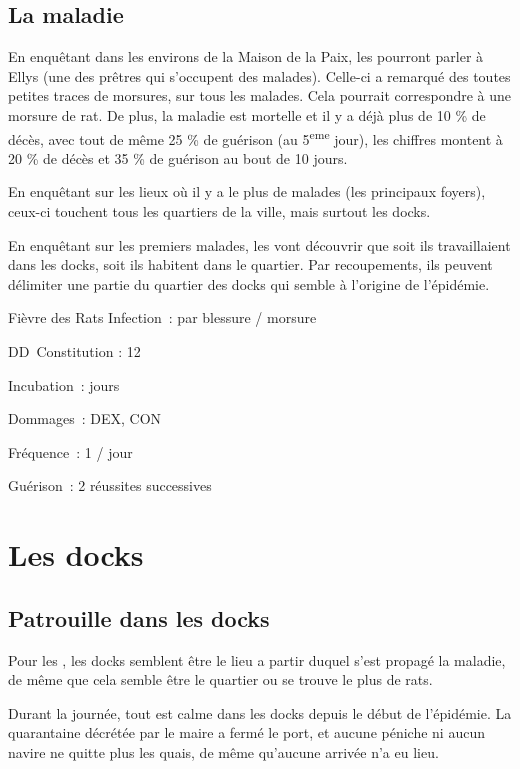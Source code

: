 \documentclass[a4paper,10pt,openany]{book}
\begin{document}
\begin{multicols}{2}
\subsection{La maladie}
En enquêtant dans les environs de la Maison de la Paix, les \PJs pourront parler à Ellys (une des prêtres qui s’occupent des malades). Celle-ci a
remarqué des toutes petites traces de morsures, sur tous les malades. Cela pourrait correspondre à une morsure de rat. De plus, la maladie est
mortelle et il y a déjà plus de 10 \% de décès, avec tout de même 25 \% de guérison (au 5\textsuperscript{eme} jour), les chiffres montent à 20 \% de
décès et 35 \% de guérison au bout de 10 jours.\par En enquêtant sur les lieux où il y a le plus de malades (les principaux foyers), ceux-ci touchent
tous les quartiers de la ville, mais surtout les  docks.\par En enquêtant sur les premiers malades, les \PJs vont découvrir que soit ils travaillaient
dans les docks, soit ils habitent dans le quartier. Par recoupements, ils peuvent délimiter une partie du quartier des docks qui semble à l’origine de
l’épidémie.

\begin{paperbox}{Fièvre des Rats}
	Infection : par blessure / morsure\par\noindent
	DD Constitution : 12\par\noindent
	Incubation :  jours\par\noindent
	Dommages :  DEX,  CON\par\noindent
	Fréquence : 1 / jour\par\noindent
	Guérison : 2 réussites successives
\end{paperbox}

\section{Les docks}
\subsection{Patrouille dans les docks}
Pour les \PJs, les docks semblent être le lieu a partir duquel s’est propagé la maladie, de même que cela semble être le quartier ou se trouve le plus
de rats. \par Durant la journée, tout est calme dans les docks depuis le début de l’épidémie. La quarantaine décrétée par le maire a fermé le port,
et aucune péniche ni aucun navire ne quitte plus les quais, de même qu’aucune arrivée n’a eu lieu.

\end{multicols}
\end{document}
